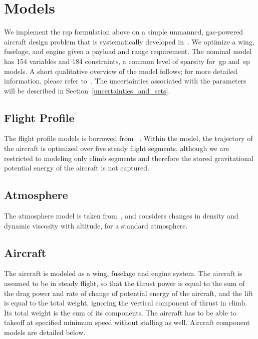 \section{Models}

We implement the \gls{rsp} formulation above on a simple unmanned, gas-powered
aircraft design problem that is systematically developed in~\cite{Ozturk2018}.
We optimize a wing, fuselage, and engine given a payload and range requirement.
The nominal model has 154 variables and 184 constraints, a common level of
sparsity for~\gls{gp} and~\gls{sp} models.
A short qualitative overview of the model follows; for
more detailed information, please refer to~\cite{Ozturk2018}. The uncertainties
associated with the parameters will be described in Section~\ref{uncertainties_and_sets}.

\subsection{Flight Profile}

The flight profile models is borrowed from ~\cite{York2018}. Within the model, the
trajectory of the aircraft is optimized over five steady flight segments,
although we are restricted to modeling only climb segments
and therefore the stored gravitational potential energy of the aircraft is not captured.

\subsection{Atmosphere}

The atmosphere model is taken from~\cite{Tao2018}, and considers changes in density and dynamic
viscosity with altitude, for a standard atmosphere.

\subsection{Aircraft}

The aircraft is modeled as a wing, fuselage and engine system. The aircraft is assumed
to be in steady flight, so that the thrust power is equal to the sum of the drag power and rate of change
of potential energy of the aircraft, and the lift is equal to the total weight, ignoring the vertical component of
thrust in climb. Its total weight is the sum of its components.
The aircraft has to be able to takeoff at specified minimum speed without stalling as well.
Aircraft component models are detailed below.


